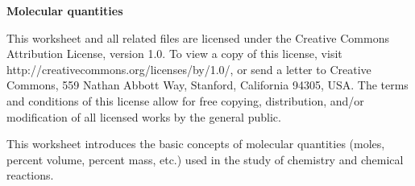 
\centerline{\bf Molecular quantities} \bigskip 
 
\vskip 5pt
 
This worksheet and all related files are licensed under the Creative Commons Attribution License, version 1.0.  To view a copy of this license, visit http://creativecommons.org/licenses/by/1.0/, or send a letter to Creative Commons, 559 Nathan Abbott Way, Stanford, California 94305, USA.  The terms and conditions of this license allow for free copying, distribution, and/or modification of all licensed works by the general public.

\bigskip 

This worksheet introduces the basic concepts of molecular quantities (moles, percent volume, percent mass, etc.) used in the study of chemistry and chemical reactions.


